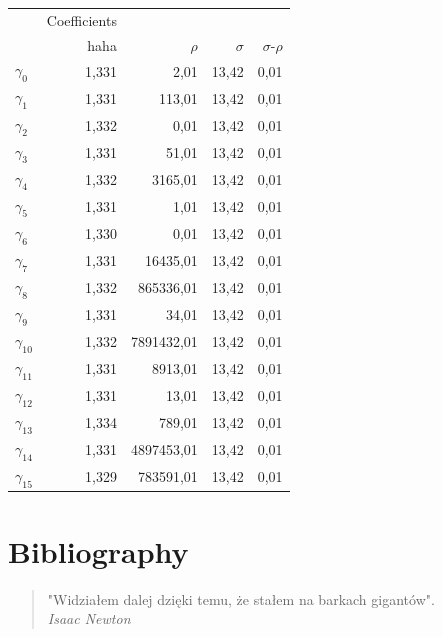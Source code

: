 \documentclass{pracamgr}
\begin{document}
\begin{center}
  \begin{tabular}{lrrrr}
    & Coefficients \\
    & haha & $\rho$ & $\sigma$ & $\sigma$-$\rho$\\
    $\gamma_{0}$ & 1,331 & 2,01 & 13,42 & 0,01 \\
    $\gamma_{1}$ & 1,331 & 113,01 & 13,42 & 0,01 \\
    $\gamma_{2}$ & 1,332 & 0,01 & 13,42 & 0,01 \\
    $\gamma_{3}$ & 1,331 & 51,01 & 13,42 & 0,01 \\
    $\gamma_{4}$ & 1,332 & 3165,01 & 13,42 & 0,01 \\
    $\gamma_{5}$ & 1,331 & 1,01 & 13,42 & 0,01 \\
    $\gamma_{6}$ & 1,330 & 0,01 & 13,42 & 0,01 \\
    $\gamma_{7}$ & 1,331 & 16435,01 & 13,42 & 0,01 \\
    $\gamma_{8}$ & 1,332 & 865336,01 & 13,42 & 0,01 \\
    $\gamma_{9}$ & 1,331 & 34,01 & 13,42 & 0,01 \\
    $\gamma_{10}$ & 1,332 & 7891432,01 & 13,42 & 0,01 \\
    $\gamma_{11}$ & 1,331 & 8913,01 & 13,42 & 0,01 \\
    $\gamma_{12}$ & 1,331 & 13,01 & 13,42 & 0,01 \\
    $\gamma_{13}$ & 1,334 & 789,01 & 13,42 & 0,01 \\
    $\gamma_{14}$ & 1,331 & 4897453,01 & 13,42 & 0,01 \\
    $\gamma_{15}$ & 1,329 & 783591,01 & 13,42 & 0,01 \\
  \end{tabular}
\end{center}

\listoffigures
{} 
\listoftables
{} 



\chapter*{Bibliography}
 

\begin{quote}
"Widziałem dalej dzięki temu, że stałem na barkach gigantów".\\

\raggedleft\slshape Isaac Newton
\end{quote}
 

\printbibliography

\printindex
\end{document}

